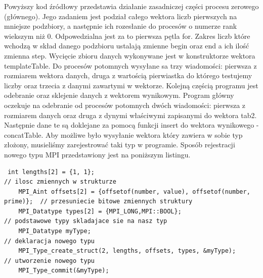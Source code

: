 \documentclass[a4paper,12pt]{article}
\begin{document}
Powyższy kod źródłowy przedstawia działanie zasadniczej części procesu zerowego (głównego). Jego zadaniem jest podział całego wektora liczb pierwszych na mniejsze podzbiory, a następnie ich rozesłanie do procesów o numerze rank wiekszym niż 0. Odpowedzialna jest za to pierwsza pętla for. Zakres liczb które wchodzą w skład danego podzbioru ustalają zmienne begin oraz end a ich ilość zmienna step. Wycięcie zbioru danych wykonywane jest w konstruktorze wektora templateTable. Do procesów potomnych wysyłane sa trzy wiadomości: pierwsza z rozmiarem wektora danych, druga z wartością pierwiastka do którego testujemy liczby oraz trzecia z danymi zawartymi w wektorze.
Kolejną częścią programu jest odebranie oraz sklejenie danych z wektorem wynikowym. Program główny oczekuje na odebranie od procesów potomnych dwóch wiadomości: pierwsza z rozmiarem danych oraz druga z dynymi właściwymi zapisanymi do wektora tab2. Następnie dane te są doklejane za pomocą funkcji insert do wektora wynikowego - concatTable.
Aby możliwe było wysyłanie wektora który zawiera w sobie typ złożony, musieliśmy zarejestrować taki typ w programie. Sposób rejestracji nowego typu MPI przedstawiony jest na poniższym listingu. 

\begin{lstlisting}
 int lengths[2] = {1, 1};                                                 // ilosc zmiennych w strukturze
    MPI_Aint offsets[2] = {offsetof(number, value), offsetof(number, prime)};  // przesuniecie bitowe zmiennych struktury
    MPI_Datatype types[2] = {MPI_LONG,MPI::BOOL};                           // podstawowe typy skladajace sie na nasz typ
    MPI_Datatype myType;                                                    // deklaracja nowego typu
    MPI_Type_create_struct(2, lengths, offsets, types, &myType);            // utworzenie nowego typu
    MPI_Type_commit(&myType);
\end{lstlisting}
\end{document}
